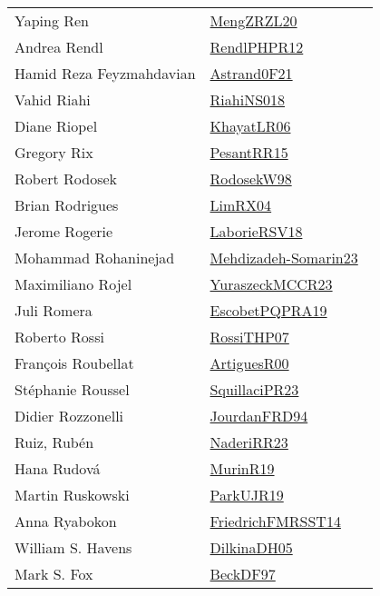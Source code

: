 {\begin{longtable}{p{4cm}p{20cm}}
Yaping Ren & \href{works/MengZRZL20.pdf}{MengZRZL20}~\cite{MengZRZL20}\\
Andrea Rendl & \href{works/RendlPHPR12.pdf}{RendlPHPR12}~\cite{RendlPHPR12}\\
Hamid Reza Feyzmahdavian & \href{works/Astrand0F21.pdf}{Astrand0F21}~\cite{Astrand0F21}\\
Vahid Riahi & \href{works/RiahiNS018.pdf}{RiahiNS018}~\cite{RiahiNS018}\\
Diane Riopel & \href{works/KhayatLR06.pdf}{KhayatLR06}~\cite{KhayatLR06}\\
Gregory Rix & \href{works/PesantRR15.pdf}{PesantRR15}~\cite{PesantRR15}\\
Robert Rodosek & \href{works/RodosekW98.pdf}{RodosekW98}~\cite{RodosekW98}\\
Brian Rodrigues & \href{works/LimRX04.pdf}{LimRX04}~\cite{LimRX04}\\
Jerome Rogerie & \href{works/LaborieRSV18.pdf}{LaborieRSV18}~\cite{LaborieRSV18}\\
Mohammad Rohaninejad & \href{works/Mehdizadeh-Somarin23.pdf}{Mehdizadeh-Somarin23}~\cite{Mehdizadeh-Somarin23}\\
Maximiliano Rojel & \href{works/YuraszeckMCCR23.pdf}{YuraszeckMCCR23}~\cite{YuraszeckMCCR23}\\
Juli Romera & \href{works/EscobetPQPRA19.pdf}{EscobetPQPRA19}~\cite{EscobetPQPRA19}\\
Roberto Rossi & \href{works/RossiTHP07.pdf}{RossiTHP07}~\cite{RossiTHP07}\\
Fran{\c{c}}ois Roubellat & \href{works/ArtiguesR00.pdf}{ArtiguesR00}~\cite{ArtiguesR00}\\
St{\'{e}}phanie Roussel & \href{works/SquillaciPR23.pdf}{SquillaciPR23}~\cite{SquillaciPR23}\\
Didier Rozzonelli & \href{}{JourdanFRD94}~\cite{JourdanFRD94}\\
Ruiz, Rub\'{e}n & \href{works/NaderiRR23.pdf}{NaderiRR23}~\cite{NaderiRR23}\\
Hana Rudov{\'{a}} & \href{works/MurinR19.pdf}{MurinR19}~\cite{MurinR19}\\
Martin Ruskowski & \href{works/ParkUJR19.pdf}{ParkUJR19}~\cite{ParkUJR19}\\
Anna Ryabokon & \href{}{FriedrichFMRSST14}~\cite{FriedrichFMRSST14}\\
William S. Havens & \href{works/DilkinaDH05.pdf}{DilkinaDH05}~\cite{DilkinaDH05}\\
Mark S. Fox & \href{works/BeckDF97.pdf}{BeckDF97}~\cite{BeckDF97}\\

\end{longtable}}
